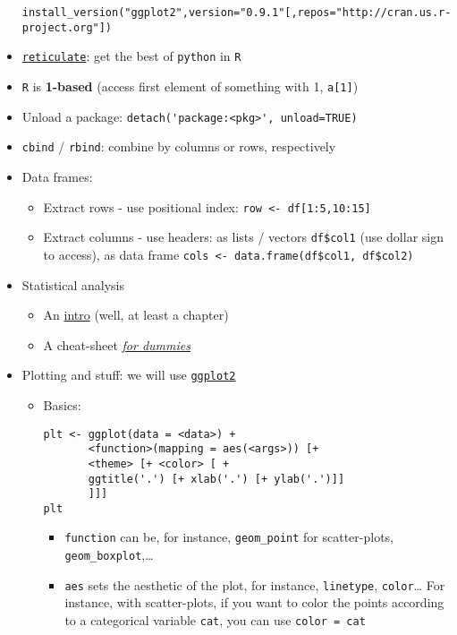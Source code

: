 \documentclass[a4paper,12pt,%
              final%
              ]{article}
\begin{document}
\begin{itemize}
\begin{verbatim}
install_version("ggplot2",version="0.9.1"[,repos="http://cran.us.r-project.org"])
\end{verbatim}
  \item \href{https://github.com/rstudio/reticulate}{\texttt{reticulate}}: get the best of \texttt{python} in \texttt{R}
  \item \texttt{R} is \textbf{1-based} (access first element of something with 1, \verb|a[1]|)
  \item Unload a package: \verb|detach('package:<pkg>', unload=TRUE)|
  \item \verb|cbind| / \verb|rbind|: combine by columns or rows, respectively
  \item Data frames:
    \begin{itemize}
      \item Extract rows - use positional index: \verb|row <- df[1:5,10:15]|
      \item Extract columns - use headers: as lists / vectors \verb|df$col1| (use dollar sign to access), as data frame \verb|cols <- data.frame(df$col1, df$col2)|
    \end{itemize}
  \item Statistical analysis
    \begin{itemize}
      \item An \href{https://cran.r-project.org/web/packages/HSAUR/vignettes/Ch_introduction_to_R.pdf}{intro} (well, at least a chapter)
      \item A cheat-sheet \href{https://www.dummies.com/programming/r/statistical-analysis-with-r-for-dummies-cheat-sheet/}{\emph{for dummies}}
    \end{itemize}
  \item Plotting and stuff: we will use \href{https://ggplot2.tidyverse.org/}{\texttt{ggplot2}}
    \begin{itemize}
      \item Basics:
\begin{verbatim}
plt <- ggplot(data = <data>) +
       <function>(mapping = aes(<args>)) [+
       <theme> [+ <color> [ +
       ggtitle('.') [+ xlab('.') [+ ylab('.')]]
       ]]]
plt
\end{verbatim}
        \begin{itemize}
          \item \verb|function| can be, for instance, \verb|geom_point| for scatter-plots, \verb|geom_boxplot|,\ldots
          \item \verb|aes| sets the aesthetic of the plot, for instance, \texttt{linetype}, \texttt{color}\ldots{} For instance, with scatter-plots, if you want to color the points according to a categorical variable \texttt{cat}, you can use \verb|color = cat|

\end{itemize}
\end{itemize}
\end{itemize}
\end{document}

